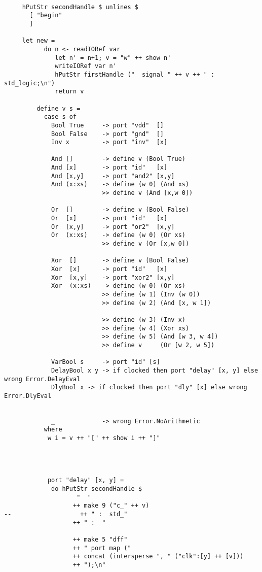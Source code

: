 \begin{lstlisting}[mathescape=false]
       
     hPutStr secondHandle $ unlines $
       [ "begin"
       ]
     
     let new =
           do n <- readIORef var	
              let n' = n+1; v = "w" ++ show n'
              writeIORef var n'
              hPutStr firstHandle ("  signal " ++ v ++ " : std_logic;\n")
              return v
         
         define v s =
           case s of
             Bool True     -> port "vdd"  []
             Bool False    -> port "gnd"  []
             Inv x         -> port "inv"  [x]

             And []        -> define v (Bool True)
             And [x]       -> port "id"   [x]
             And [x,y]     -> port "and2" [x,y]
             And (x:xs)    -> define (w 0) (And xs)
                           >> define v (And [x,w 0])

             Or  []        -> define v (Bool False)
             Or  [x]       -> port "id"   [x]
             Or  [x,y]     -> port "or2"  [x,y]
             Or  (x:xs)    -> define (w 0) (Or xs)
                           >> define v (Or [x,w 0])

             Xor  []       -> define v (Bool False)
             Xor  [x]      -> port "id"   [x]
             Xor  [x,y]    -> port "xor2" [x,y]
             Xor  (x:xs)   -> define (w 0) (Or xs)
                           >> define (w 1) (Inv (w 0))
                           >> define (w 2) (And [x, w 1])
                           
                           >> define (w 3) (Inv x)
                           >> define (w 4) (Xor xs)
                           >> define (w 5) (And [w 3, w 4])
                           >> define v     (Or [w 2, w 5])

             VarBool s     -> port "id" [s]
             DelayBool x y -> if clocked then port "delay" [x, y] else wrong Error.DelayEval
             DlyBool x -> if clocked then port "dly" [x] else wrong Error.DlyEval
             

             _             -> wrong Error.NoArithmetic
           where
            w i = v ++ "[" ++ show i ++ "]"
            


            
            port "delay" [x, y] =
             do hPutStr secondHandle $
                    "  "
                   ++ make 9 ("c_" ++ v)
--                   ++ " :  std_"
                   ++ " :  "

                   ++ make 5 "dff"
                   ++ " port map ("
                   ++ concat (intersperse ", " ("clk":[y] ++ [v]))
                   ++ ");\n"   



\end{lstlisting}
